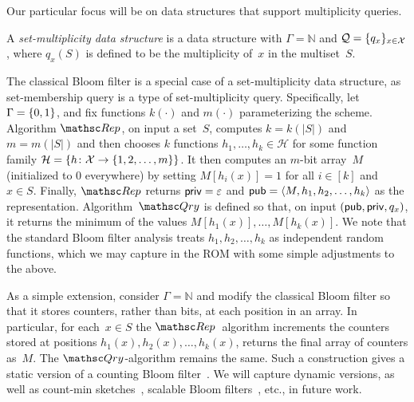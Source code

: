  Our
particular focus will be on data structures that support
multiplicity queries.

\begin{definition} \rm
A \emph{set-multiplicity data structure} is a data structure with
$\Gamma=\mathbb{N}$ and ${\cal Q}=\{q_x\}_{x \in {\cal X}}$, where
$q_x(S)$ is defined to be the multiplicity of~$x$ in the
multiset~$S$. \hfill\dqed
\end{definition}

The classical Bloom filter is a special case of a set-multiplicity
data structure, as set-membership query is a type of
set-multiplicity query.  Specifically, 
let $\Gamma=\{0,1\}$, and fix functions
$k(\cdot)$ and $m(\cdot)$ parameterizing the scheme. Algorithm
$\Rep$, on input a set~$S$, computes $k=k(|S|)$ and $m=m(|S|)$ and
then chooses $k$ functions $h_1, \ldots, h_k \in \mathcal{H}$ for
some function family $\mathcal{H}=\{h \colon {\cal X} \to
\{1,2,\ldots,m\}\}$.   
It then computes an $m$-bit array~$M$ (initialized to 0 everywhere) by setting
$M[h_i(x)]=1$ for all $i\in [k]$ and $x \in S$.  Finally, $\Rep$
returns ${\sf priv}=\varepsilon$ and ${\sf pub} = \langle M,h_1,h_2,\ldots,h_k\rangle$ as the
representation.
%
Algorithm~$\Qry$ is defined so that, on input
$({\sf pub},{\sf priv},q_x)$, it returns the minimum of the values
$M[h_1(x)],\ldots,M[h_k(x)]$.  We note that the standard Bloom filter
analysis treats $h_1,h_2,\ldots,h_k$ as independent random functions,
which we may capture in the ROM with some simple adjustments to the above.

As a simple extension, consider $\Gamma=\mathbb{N}$ and modify the
classical Bloom filter so that it stores counters, rather than bits, at
each position in an array.  In particular, for each~$x \in S$ the
$\Rep$~algorithm increments the counters stored at positions
$h_1(x), h_2(x), \ldots, h_k(x)$, returns the final array of
counters as~$M$.  The $\Qry$-algorithm remains the same. Such a
construction gives a static version of a counting Bloom
filter~\cite{xxx}.  We will capture dynamic versions, as well as
count-min sketches~\cite{xxx}, scalable Bloom filters~\cite{xxx},
etc., in future work.


